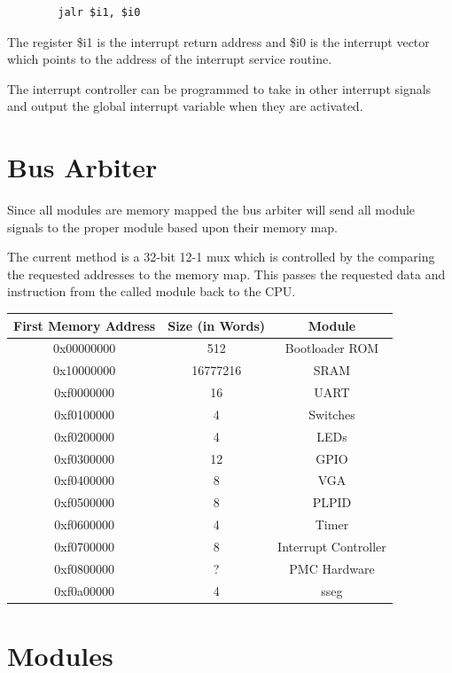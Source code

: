 \documentclass{article}
\begin{document}
\begin{verbatim}
		jalr $i1, $i0 
\end{verbatim} 

The register \$i1 is the interrupt return address and \$i0 is the interrupt vector which points to the address of the interrupt service routine. 

The interrupt controller can be programmed to take in other interrupt signals and output the global interrupt variable when they are activated.

\section{Bus Arbiter}

Since all modules are memory mapped the bus arbiter will send all module signals to the proper module based upon their memory map.

The current method is a 32-bit 12-1 mux which is controlled by the comparing the requested addresses to the memory map. This passes the requested data and instruction from the called module back to the CPU.

\begin{tabular}{|c|c|c|}
\hline
\textbf{First Memory Address} & \textbf{Size} (in Words) & \textbf{Module}   \\ \hline
\hline 0x00000000 & 512      & Bootloader ROM \\ 
\hline 0x10000000 & 16777216 & SRAM \\ 
\hline 0xf0000000 & 16       & UART \\ 
\hline 0xf0100000 & 4        & Switches \\ 
\hline 0xf0200000 & 4        & LEDs \\  
\hline 0xf0300000 & 12       & GPIO \\ 
\hline 0xf0400000 & 8        & VGA \\
\hline 0xf0500000 & 8        & PLPID \\ 
\hline 0xf0600000 & 4        & Timer \\ 
\hline 0xf0700000 & 8        & Interrupt Controller \\ 
\hline 0xf0800000 & ?        & PMC Hardware \\ 
\hline 0xf0a00000 & 4        & sseg \\
\hline 
\end{tabular}  

\section{Modules}
\end{document}
